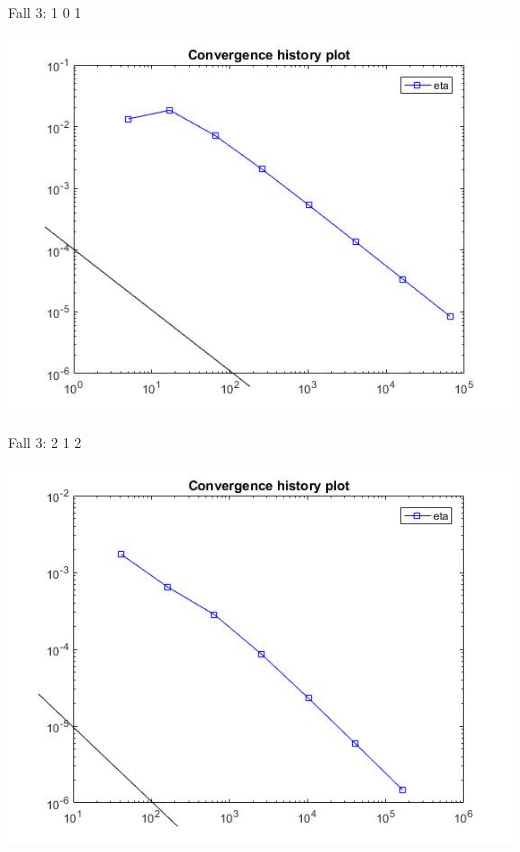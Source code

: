 \documentclass[xcolor=svgnames,ngerman]{beamer}
\begin{document}
				\begin{frame}{Fall 3: 1 0 1}
\begin{center}
	\includegraphics[scale=0.3]{101.jpg}
\end{center}
	\end{frame}	
					\begin{frame}{Fall 3: 2 1 2}
\begin{center}
	\includegraphics[scale=0.3]{212.jpg}
\end{center}
	\end{frame}	
\end{document}
